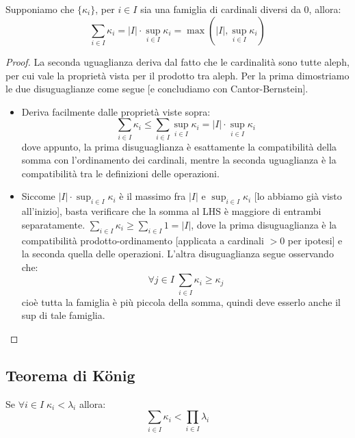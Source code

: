 \pagebreak
\begin{proposition}
	Supponiamo che $\{\kappa_i\}$, per $i \in I$ sia una famiglia di cardinali diversi da 0, allora:
	\[ \sum_{i \in I}\kappa_i = |I| \cdot \sup_{i \in I} \kappa_i = \max\left(|I|, \sup_{i \in I}\kappa_i\right)
		\]
\end{proposition}

\begin{proof}
	La seconda uguaglianza deriva dal fatto che le cardinalit\`a sono tutte aleph, per cui vale la propriet\`a vista per il prodotto tra aleph. Per la prima dimostriamo le due disuguaglianze come segue [e concludiamo con Cantor-Bernstein].
	\begin{itemize}
		\item[$\boxed{\leq}$] Deriva facilmente dalle propriet\`a viste sopra:
		\[ \sum_{i \in I} \kappa_i \leq \sum_{i \in I} \sup_{i \in I}\kappa_i = |I| \cdot \sup_{i \in I} \kappa_i
			\]
		dove appunto, la prima disuguaglianza \`e esattamente la compatibilit\`a della somma con l'ordinamento dei cardinali, mentre la seconda uguaglianza \`e la compatibilit\`a tra le definizioni delle operazioni.
		\item[$\boxed{\geq}$] Siccome $|I| \cdot \sup_{i \in I} \kappa_i$ \`e il massimo fra $|I|$ e $\sup_{i \in I} \kappa_i$ [lo abbiamo gi\`a visto all'inizio], basta verificare che la somma al LHS \`e maggiore di entrambi separatamente.
		$\sum_{i \in I}\kappa_i \geq \sum_{i \in I} 1 = |I|$, dove la prima disuguaglianza \`e la compatibilit\`a prodotto-ordinamento [applicata a cardinali $>0$ per ipotesi] e la seconda quella delle operazioni. L'altra disuguaglianza segue osservando che:
		\[ \forall j \in I \; \sum_{i \in I} \kappa_i \geq \kappa_j
			\]
		cio\`e tutta la famiglia \`e pi\`u piccola della somma, quindi deve esserlo anche il sup di tale famiglia.
	\end{itemize}
\end{proof}

\subsection{Teorema di König}

\begin{proposition}
	Se $\forall i \in I \; \kappa_i < \lambda_i$ allora:
	\[ \sum_{i \in I} \kappa_i < \prod_{i \in I} \lambda_i
		\]
\end{proposition}

